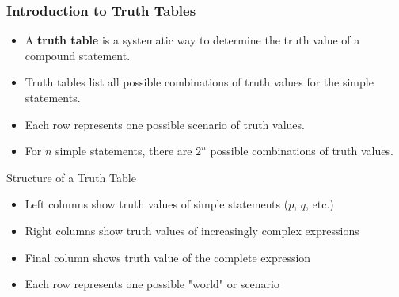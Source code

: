 \documentclass{beamer}
\begin{document}
                \begin{frame}
                \frametitle{Introduction to Truth Tables}
                \begin{itemize}
                    \item A \textbf{truth table} is a systematic way to determine the truth value of a compound statement.
                    \item Truth tables list all possible combinations of truth values for the simple statements.
                    \item Each row represents one possible scenario of truth values.
                    \item For $n$ simple statements, there are $2^n$ possible combinations of truth values.
                \end{itemize}
                
                \begin{block}{Structure of a Truth Table}
                \begin{itemize}
                    \item Left columns show truth values of simple statements ($p$, $q$, etc.)
                    \item Right columns show truth values of increasingly complex expressions
                    \item Final column shows truth value of the complete expression
                    \item Each row represents one possible "world" or scenario
                \end{itemize}
                \end{block}
                \end{frame}
                
\end{document}
